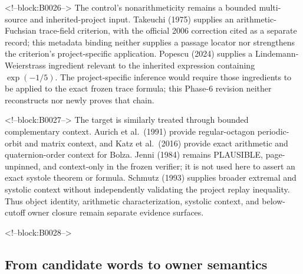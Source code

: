 \documentclass[11pt,a4paper]{article}
\begin{document}
<!--block:B0026-->
The control's nonarithmeticity remains a bounded multi-source and inherited-project input. Takeuchi (1975)
\citep{P33-S03,P33-S03-CORR}
 supplies an arithmetic-Fuchsian trace-field criterion, with the official 2006 correction cited as a separate record; this metadata binding neither supplies a passage locator nor strengthens the criterion's project-specific application. Popescu (2024)
\citep{P33-S04}
 supplies a Lindemann-Weierstrass ingredient relevant to the inherited expression containing \(\exp(-1/5)\). The project-specific inference would require those ingredients to be applied to the exact frozen trace formula; this Phase-6 revision neither reconstructs nor newly proves that chain.

<!--block:B0027-->
The target is similarly treated through bounded complementary context. Aurich et al.~(1991)
\citep{P33-S05}
 provide regular-octagon periodic-orbit and matrix context, and Katz et al.~(2016)
\citep{P33-S08}
 provide exact arithmetic and quaternion-order context for Bolza. Jenni (1984)
\citep{P33-S06}
 remains PLAUSIBLE, page-unpinned, and context-only in the frozen verifier; it is not used here to assert an exact systole theorem or formula. Schmutz (1993)
\citep{P33-S07}
 supplies broader extremal and systolic context without independently validating the project replay inequality. Thus object identity, arithmetic characterization, systolic context, and below-cutoff owner closure remain separate evidence surfaces.

<!--block:B0028-->
\hypertarget{from-candidate-words-to-owner-semantics}{%
\subsection{From candidate words to owner semantics}\label{from-candidate-words-to-owner-semantics}}
\end{document}
